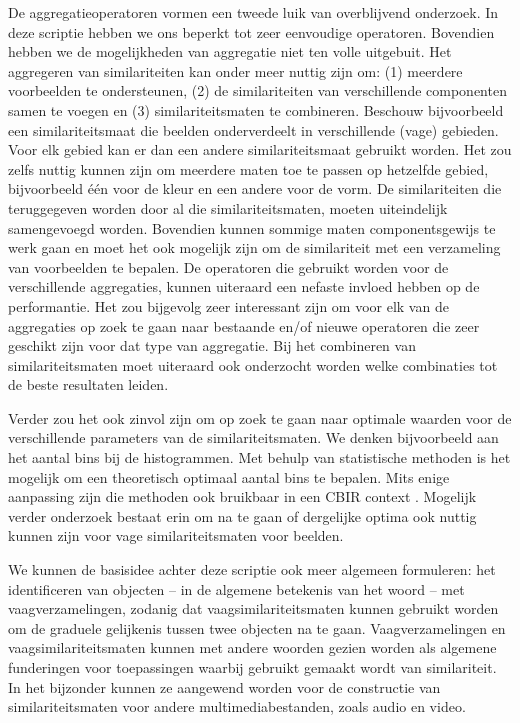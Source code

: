 De aggregatieoperatoren vormen een tweede luik van overblijvend onderzoek. In deze
scriptie hebben we ons beperkt tot zeer eenvoudige operatoren. Bovendien hebben
we de mogelijkheden van aggregatie niet ten volle uitgebuit. Het
aggregeren van similariteiten kan onder meer nuttig zijn om: (1) meerdere voorbeelden 
te ondersteunen, (2) de similariteiten van verschillende componenten samen te voegen
en (3) similariteitsmaten te combineren.
Beschouw bijvoorbeeld een similariteitsmaat die beelden onderverdeelt in 
verschillende (vage) gebieden. Voor elk gebied kan er dan een andere similariteitsmaat
gebruikt worden. Het zou zelfs nuttig kunnen zijn om meerdere maten toe te passen
op hetzelfde gebied, bijvoorbeeld \'e\'en voor de kleur en een andere voor de vorm.
De similariteiten die teruggegeven worden door al die similariteitsmaten, moeten
uiteindelijk samengevoegd worden. Bovendien kunnen sommige maten
componentsgewijs te werk gaan en moet het ook mogelijk zijn om de similariteit met
een verzameling van voorbeelden te bepalen. De operatoren die gebruikt worden voor
de verschillende aggregaties, kunnen uiteraard een nefaste invloed hebben op
de performantie. Het zou bijgevolg zeer interessant zijn om voor elk van de 
aggregaties op zoek te gaan naar bestaande en/of nieuwe operatoren die 
zeer geschikt zijn voor dat type van aggregatie. Bij het combineren van 
similariteitsmaten moet uiteraard ook onderzocht worden welke combinaties
tot de beste resultaten leiden.

Verder zou het ook zinvol zijn om op zoek te gaan naar optimale waarden
voor de verschillende parameters van de similariteitsmaten. We denken bijvoorbeeld
aan het aantal bins bij de histogrammen. Met behulp van statistische methoden is het
mogelijk om een theoretisch optimaal aantal bins te bepalen. Mits enige aanpassing
zijn die methoden ook bruikbaar in een CBIR context 
\cite{viet_tran:ir_with_statistical_color_descriptors}. Mogelijk verder onderzoek bestaat
erin om na te gaan of dergelijke optima ook nuttig kunnen zijn voor vage 
similariteitsmaten voor beelden. 

We kunnen de basisidee achter deze scriptie ook meer algemeen formuleren: het 
identificeren van objecten -- in de algemene betekenis van het woord -- met 
vaagverzamelingen, zodanig dat vaagsimilariteitsmaten kunnen gebruikt worden
om de graduele gelijkenis tussen twee objecten na te gaan. Vaagverzamelingen en
vaagsimilariteitsmaten kunnen met andere woorden gezien worden als algemene
funderingen voor toepassingen waarbij gebruikt gemaakt wordt van similariteit.
In het bijzonder kunnen ze aangewend worden voor de constructie van similariteitsmaten
voor andere multimediabestanden, zoals audio en video.